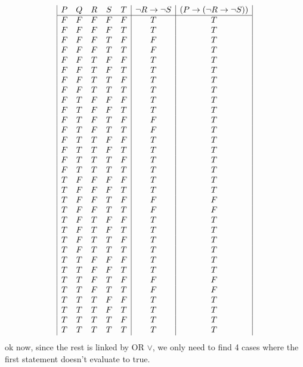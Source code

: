 \documentclass[a4paper,12pt]{article}
\begin{document}
\begin{displaymath}
\begin {array} {|c c c c c|c|c|c|c|c|}
P & Q & R & S & T &
\lnot R \rightarrow \lnot S & 
(P \rightarrow (\lnot R \rightarrow \lnot S)) \\
\hline

F & F & F & F & F & T & T\\
F & F & F & F & T & T & T\\
F & F & F & T & F & F & T\\
F & F & F & T & T & F & T\\
F & F & T & F & F & T & T\\
F & F & T & F & T & T & T\\
F & F & T & T & F & T & T\\
F & F & T & T & T & T & T\\
F & T & F & F & F & T & T\\
F & T & F & F & T & T & T\\
F & T & F & T & F & F & T\\
F & T & F & T & T & F & T\\
F & T & T & F & F & T & T\\
F & T & T & F & T & T & T\\
F & T & T & T & F & T & T\\
F & T & T & T & T & T & T\\
T & F & F & F & F & T & T\\
T & F & F & F & T & T & T\\
T & F & F & T & F & F & F\\
T & F & F & T & T & F & F\\
T & F & T & F & F & T & T\\
T & F & T & F & T & T & T\\
T & F & T & T & F & T & T\\
T & F & T & T & T & T & T\\
T & T & F & F & F & T & T\\
T & T & F & F & T & T & T\\
T & T & F & T & F & F & F\\
T & T & F & T & T & F & F\\
T & T & T & F & F & T & T\\
T & T & T & F & T & T & T\\
T & T & T & T & F & T & T\\
T & T & T & T & T & T & T\\
\end{array}
\end{displaymath}
ok now, since the rest is linked by OR $\vee$, we only need
to find 4 cases where the first statement doesn't evaluate to true.
\end{document}
